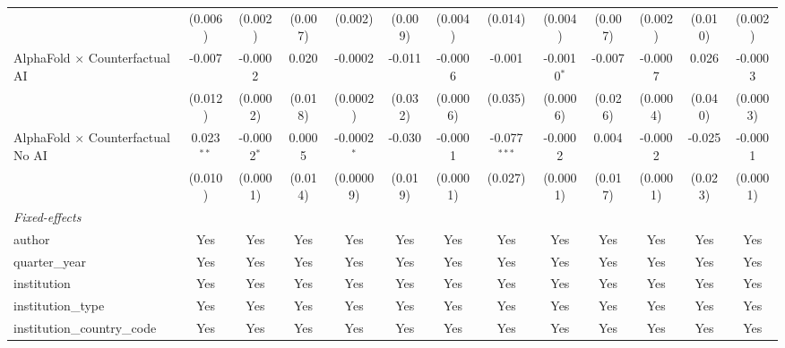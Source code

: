 \begin{tabular}{lcccccccccccc}
                                            & (0.006)       & (0.002)       & (0.007)       & (0.002)       & (0.009)       & (0.004)      & (0.014)        & (0.004)       & (0.007)       & (0.002)  & (0.010)       & (0.002)\\   
   AlphaFold $\times$ Counterfactual AI     & -0.007        & -0.0002       & 0.020         & -0.0002       & -0.011        & -0.0006      & -0.001         & -0.0010$^{*}$ & -0.007        & -0.0007  & 0.026         & -0.0003\\   
                                            & (0.012)       & (0.0002)      & (0.018)       & (0.0002)      & (0.032)       & (0.0006)     & (0.035)        & (0.0006)      & (0.026)       & (0.0004) & (0.040)       & (0.0003)\\   
   AlphaFold $\times$ Counterfactual No AI  & 0.023$^{**}$  & -0.0002$^{*}$ & 0.0005        & -0.0002$^{*}$ & -0.030        & -0.0001      & -0.077$^{***}$ & -0.0002       & 0.004         & -0.0002  & -0.025        & -0.0001\\   
                                            & (0.010)       & (0.0001)      & (0.014)       & (0.00009)     & (0.019)       & (0.0001)     & (0.027)        & (0.0001)      & (0.017)       & (0.0001) & (0.023)       & (0.0001)\\   
   \midrule
   \emph{Fixed-effects}\\
   author                                   & Yes           & Yes           & Yes           & Yes           & Yes           & Yes          & Yes            & Yes           & Yes           & Yes      & Yes           & Yes\\  
   quarter\_year                            & Yes           & Yes           & Yes           & Yes           & Yes           & Yes          & Yes            & Yes           & Yes           & Yes      & Yes           & Yes\\  
   institution                              & Yes           & Yes           & Yes           & Yes           & Yes           & Yes          & Yes            & Yes           & Yes           & Yes      & Yes           & Yes\\  
   institution\_type                        & Yes           & Yes           & Yes           & Yes           & Yes           & Yes          & Yes            & Yes           & Yes           & Yes      & Yes           & Yes\\  
   institution\_country\_code               & Yes           & Yes           & Yes           & Yes           & Yes           & Yes          & Yes            & Yes           & Yes           & Yes      & Yes           & Yes\\  

\end{tabular}
